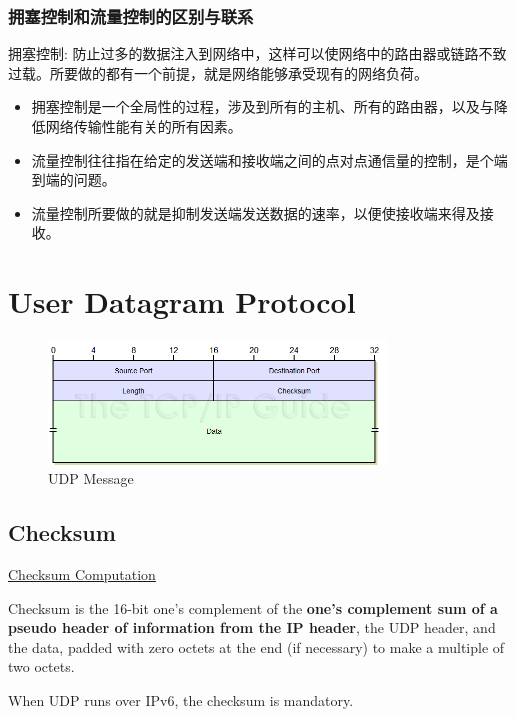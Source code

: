 \documentclass[a4paper]{report}
\begin{document}
\subsubsection{拥塞控制和流量控制的区别与联系}
拥塞控制: 防止过多的数据注入到网络中，这样可以使网络中的路由器或链路不致过载。所要做的都有一个前提，就是网络能够承受现有的网络负荷。
\begin{itemize}
  \item 拥塞控制是一个全局性的过程，涉及到所有的主机、所有的路由器，以及与降低网络传输性能有关的所有因素。 
  \item 流量控制往往指在给定的发送端和接收端之间的点对点通信量的控制，是个端到端的问题。 
  \item 流量控制所要做的就是抑制发送端发送数据的速率，以便使接收端来得及接收。 
\end{itemize}


\section{User Datagram Protocol}
\begin{figure}[H]
\centering
\includegraphics[width=0.8\textwidth]{udpformat.png}
\caption{UDP Message}
\end{figure}
\subsection{Checksum}
\href{https://en.wikipedia.org/wiki/User_Datagram_Protocol#Checksum_computation}{Checksum Computation}

Checksum is the 16-bit one's complement of the \textbf{one's complement sum of a pseudo header of information from the IP header}, the UDP header, and the data,  padded  with zero octets  at the end (if  necessary)  to  make  a multiple of two octets.

When UDP runs over IPv6, the checksum is mandatory. 
\end{document}
